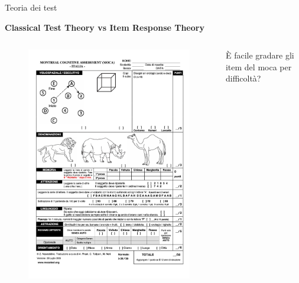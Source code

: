 \documentclass[
  ignorenonframetext,
]{beamer}
\begin{document}
\begin{frame}{Teoria dei test}
\label{teoria-dei-test-10}
\begin{center}
  \textbf{Classical Test Theory vs Item Response Theory}
\end{center}
\vspace{2em}

\begin{columns}
  \begin{column}{0.5\textwidth}
    \begin{figure}
    \includegraphics[scale=0.1]{Figures/MoCA-Test-Italian.png}
    \end{figure}
  \end{column}
  \begin{column}{0.5\textwidth}
    È facile gradare gli item del moca per difficoltà?
  \end{column}
\end{columns}
\end{frame}
\end{document}
